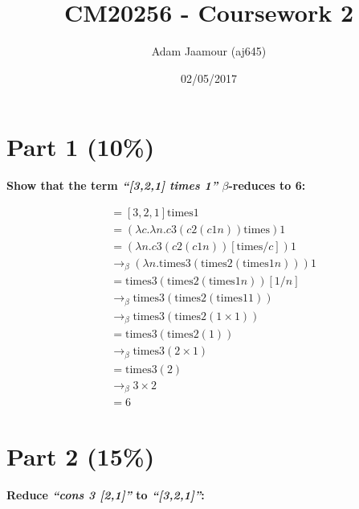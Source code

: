 \documentclass{article}
\title{CM20256 - Coursework 2}
\date{02/05/2017}
\author{Adam Jaamour (aj645)}
\begin{document}
	\newcommand{\lamb}{$\lambda$}
	\newcommand{\la}{\lambda}
	\newcommand{\be}{$\beta$}
	\newcommand{\tim}{\text{times}}
	\newcommand{\sa}{\quad}
	\newcommand{\equals}{\rightarrow_\beta}
	\newcommand{\equalsT}{\sa \rightarrow_\beta^*\sa}
	
	\maketitle
	\newpage
	
	
	\section{Part 1 (10\%)}
	\textbf{Show that the term \textit{``[3,2,1] times 1''} $\beta$-reduces to 6:}

	\begin{align*}
		&= [3,2,1] \tim 1 \\
		&= (\la c. \la n . c3(c2(c 1 n)) \tim ) 1 \\
		&= (\la n . c3(c2(c 1 n)) [\tim / c ] ) 1 \\
		&\equals (\la n . \tim 3(\tim 2(\tim 1 n))) 1 \\
		&= \tim 3(\tim 2(\tim 1 n)) [1/n] \\
		&\equals \tim 3(\tim 2(\tim 1 1)) \\
		&\equals \tim 3(\tim 2(1 \times 1)) \\
		&= \tim 3(\tim 2(1)) \\
		&\equals \tim 3(2 \times 1) \\
		&= \tim 3(2) \\
		&\equals 3 \times 2 \\
		&= 6
	\end{align*}
	
	
	
	\section{Part 2 (15\%)}
	\textbf{Reduce \textit{``cons 3 [2,1]''} to \textit{``[3,2,1]''}:}
	
\end{document}
